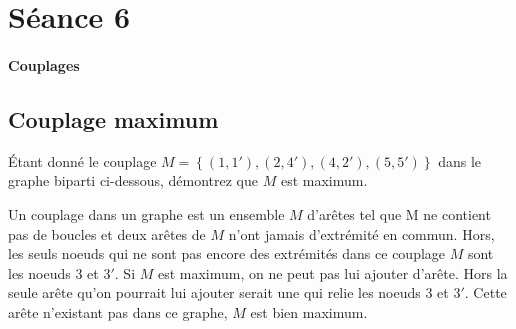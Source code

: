 \section{Séance 6}

\paragraph{Couplages}

\subsection{Couplage maximum}
Étant donné le couplage $M = \left\lbrace  (1,1'), (2,4'),(4,2'),(5,5')  \right\rbrace$ dans le graphe biparti ci-dessous, démontrez que $M$ est maximum.

\begin{figure}[h!]
  \begin{center}
  \end{center}
\end{figure}
\begin{solution}
Un couplage dans un graphe est un ensemble $M$ d’arêtes tel que
M ne contient pas de boucles et deux arêtes de $M$ n’ont jamais
d’extrémité en commun.
Hors, les seuls noeuds qui ne sont pas encore des extrémités dans ce couplage $M$ sont les noeuds $3$ et $3'$.
Si $M$ est maximum, on ne peut pas lui ajouter d'arête.
Hors la seule arête qu'on pourrait lui ajouter serait une qui relie les noeuds $3$ et $3'$.
Cette arête n'existant pas dans ce graphe, $M$ est bien maximum.
\end{solution}
